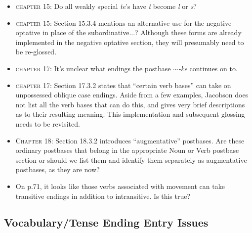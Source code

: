 \documentclass{article}
\begin{document}
\begin{itemize}
\renewcommand\labelitemi{$\cdot$}

\item \textsc{chapter 15}: Do all weakly special \textit{te}'s have \textit{t} become \textit{l} or \textit{s}?

\item \textsc{chapter 15}: Section 15.3.4  mentions an alternative use for the negative optative in place of the subordinative...?
%
Although these forms are already implemented in the negative optative section, they will presumably need to be re-glossed.

\item \textsc{chapter 17}: It's unclear what endings the postbase \textit{$\sim$-ke} continues on to.

\item \textsc{chapter 17}: Section 17.3.2 states that ``certain verb bases'' can take on unpossessed oblique case endings.
%
Aside from a few examples, Jacobson does not list all the verb bases that can do this, and gives very brief descriptions as to their resulting meaning.
%
This implementation and subsequent glossing needs to be revisited.

\item \textsc{Chapter 18}: Section 18.3.2 introduces ``augmentative'' postbases.
%
Are these ordinary postbases that belong in the appropriate Noun or Verb postbase section or should we list them and identify them separately as augmentative postbases, as they are now?

\item On p.71, it looks like those verbs associated with movement can take transitive endings in addition to intransitive.
%
Is this true?

\end{itemize}


\subsection{Vocabulary/Tense Ending Entry Issues}
\end{document}
